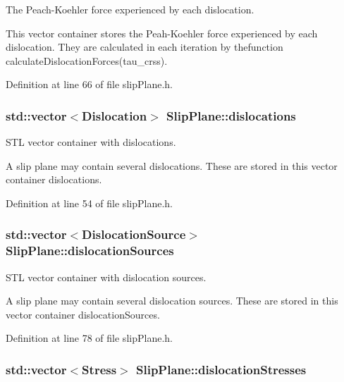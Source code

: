 The Peach-\/\-Koehler force experienced by each dislocation. 

This vector container stores the Peah-\/\-Koehler force experienced by each dislocation. They are calculated in each iteration by thefunction calculate\-Dislocation\-Forces(tau\-\_\-crss). 

Definition at line 66 of file slip\-Plane.\-h.

\hypertarget{classSlipPlane_ad92c7c409f7e161db449528389180910}{
\subsubsection[{dislocations}]{\setlength{\rightskip}{0pt plus 5cm}std\-::vector$<${\bf Dislocation}$>$ Slip\-Plane\-::dislocations\hspace{0.3cm}{\ttfamily [protected]}}}\label{db/d25/classSlipPlane_ad92c7c409f7e161db449528389180910}


S\-T\-L vector container with dislocations. 

A slip plane may contain several dislocations. These are stored in this vector container dislocations. 

Definition at line 54 of file slip\-Plane.\-h.

\hypertarget{classSlipPlane_a8e31e904fc6e68cc7ba70b0b57a278cc}{
\subsubsection[{dislocation\-Sources}]{\setlength{\rightskip}{0pt plus 5cm}std\-::vector$<${\bf Dislocation\-Source}$>$ Slip\-Plane\-::dislocation\-Sources\hspace{0.3cm}{\ttfamily [protected]}}}\label{db/d25/classSlipPlane_a8e31e904fc6e68cc7ba70b0b57a278cc}


S\-T\-L vector container with dislocation sources. 

A slip plane may contain several dislocation sources. These are stored in this vector container dislocation\-Sources. 

Definition at line 78 of file slip\-Plane.\-h.

\hypertarget{classSlipPlane_adaa1bb736c2912f5e06e7aa4553c1ebd}{
\subsubsection[{dislocation\-Stresses}]{\setlength{\rightskip}{0pt plus 5cm}std\-::vector$<${\bf Stress}$>$ Slip\-Plane\-::dislocation\-Stresses\hspace{0.3cm}{\ttfamily [protected]}}}\label{db/d25/classSlipPlane_adaa1bb736c2912f5e06e7aa4553c1ebd}


